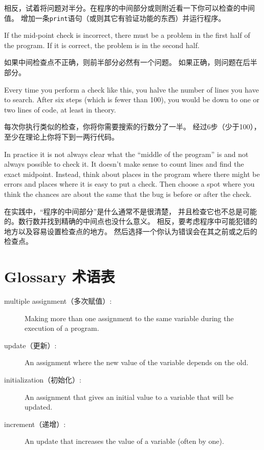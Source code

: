 \documentclass[10pt]{book}
\begin{document}
\begin{CJK}{UTF8}{gbsn}
相反，试着将问题对半分。在程序的中间部分或则附近看一下你可以检查的中间值。
增加一条{\tt print}语句（或则其它有验证功能的东西）并运行程序。

If the mid-point check is incorrect, there must be a problem in the
first half of the program.  If it is correct, the problem is
in the second half.

如果中间检查点不正确，则前半部分必然有一个问题。
如果正确，则问题在后半部分。

Every time you perform a check like this, you halve the number of
lines you have to search.  After six steps (which is fewer than 100),
you would be down to one or two lines of code, at least in theory.

每次你执行类似的检查，你将你需要搜索的行数分了一半。
经过6步（少于100），至少在理论上你将下到一两行代码。

In practice it is not always clear what
the ``middle of the program'' is and not always possible to
check it.  It doesn't make sense to count lines and find the
exact midpoint.  Instead, think about places
in the program where there might be errors and places where it
is easy to put a check.  Then choose a spot where you
think the chances are about the same that the bug is before
or after the check.

在实践中，``程序的中间部分''是什么通常不是很清楚，
并且检查它也不总是可能的。数行数并找到精确的中间点也没什么意义。
相反，要考虑程序中可能犯错的地方以及容易设置检查点的地方。
然后选择一个你认为错误会在其之前或之后的检查点。

\section{Glossary 术语表}

\begin{description}

\item[multiple assignment（多次赋值）:] Making more than one assignment to the same
variable during the execution of a program.

\item[update（更新）:] An assignment where the new value of the variable
depends on the old.

\item[initialization（初始化）:] An assignment that gives an initial value to
a variable that will be updated.

\item[increment（递增）:] An update that increases the value of a variable
(often by one).


\end{description}
\end{CJK}
\end{document}
